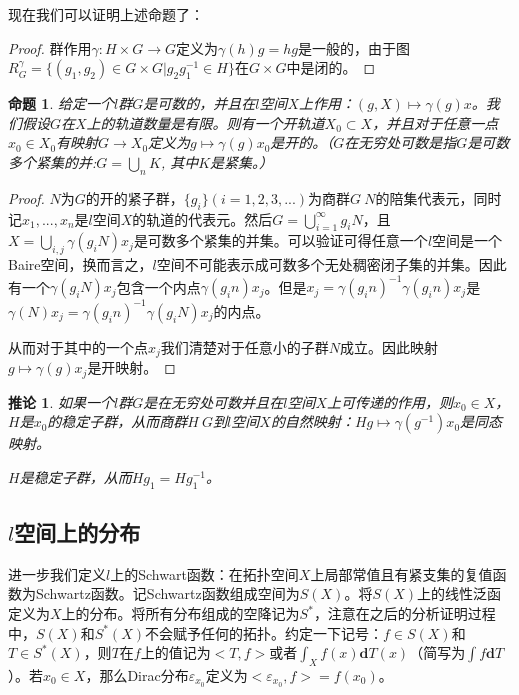 \documentclass{article}
\newtheorem{proposition}{命题}
\newtheorem{corollary}{推论}
\newtheorem{proof}{证明}
\begin{document}
 现在我们可以证明上述命题了：
\begin{proof}
群作用$\gamma: H\times G\rightarrow G$定义为$\gamma(h)g=hg$是一般的，由于图 $R^{\gamma}_{G}=\{(g_{1},g_{2})\in G\times G| g_{2}g_{1}^{-1}\in H\}$在$G\times G$中是闭的。
\end{proof}

\begin{proposition}
    给定一个$l$群$G$是可数的，并且在$l$空间$X$上作用：$(g,X)\mapsto\gamma(g)x$。我们假设$G$在$X$上的轨道数量是有限。则有一个开轨道$X_{0}\subset X$，并且对于任意一点$x_{0}\in X_{0}$有映射$G\rightarrow X_{0}$定义为$g\mapsto\gamma(g)x_{0}$是开的。（$G$在无穷处可数是指$G$是可数多个紧集的并:$G=\bigcup\limits_{n}K$, 其中$K$是紧集。）
\end{proposition}
\begin{proof}
$N$为$G$的开的紧子群，$\{g_{i}\}(i=1,2,3,...)$为商群$G\ N$的陪集代表元，同时记$x_{1},...,x_{n}$是$l$空间$X$的轨道的代表元。然后$G=\bigcup\limits^{\infty}_{i=1}g_{i}N$，且$X=\bigcup\limits_{i,j}\gamma(g_{i}N)x_{j}$是可数多个紧集的并集。可以验证可得任意一个$l$空间是一个Baire空间，换而言之，$l$空间不可能表示成可数多个无处稠密闭子集的并集。因此有一个$\gamma(g_{i}N)x_{j}$包含一个内点$\gamma(g_{i}n)x_{j}$。但是$x_{j}=\gamma(g_{i}n)^{-1}\gamma(g_{i}n)x_{j}$是$\gamma(N)x_{j}=\gamma(g_{i}n)^{-1}\gamma(g_{i}N)x_{j}$的内点。

从而对于其中的一个点$x_{j}$我们清楚对于任意小的子群$N$成立。因此映射$g\mapsto \gamma(g)x_{j}$是开映射。
\end{proof}
\begin{corollary}
如果一个$l$群$G$是在无穷处可数并且在$l$空间$X$上可传递的作用，则$x_{0}\in X$，$H$是$x_{0}$的稳定子群，从而商群$H\ G$到$l$空间$X$的自然映射：$Hg\mapsto\gamma(g^{-1})x_{0}$是同态映射。

$H$是稳定子群，从而$Hg_{1}=Hg_{1}^{-1}$。
\end{corollary}
\subsection{$l$空间上的分布}
进一步我们定义$l$上的Schwart函数：在拓扑空间$X$上局部常值且有紧支集的复值函数为Schwartz函数。记Schwartz函数组成空间为$S(X)$。将$S(X)$上的线性泛函定义为$X$上的分布。将所有分布组成的空降记为$S^{*}$，注意在之后的分析证明过程中，$S(X)$和$S^{*}(X)$不会赋予任何的拓扑。约定一下记号：$f\in S(X)$和$T\in S^{*}(X)$，则$T$在$f$上的值记为$<T,f>$或者$\int_{X}f(x)\mathbf{d}T(x)$（简写为$\int f\mathbf{d}T$）。若$x_{0}\in X$，那么Dirac分布$\varepsilon_{x_{0}}$定义为$<\varepsilon_{x_{0}},f>=f(x_{0})$。
\end{document}

